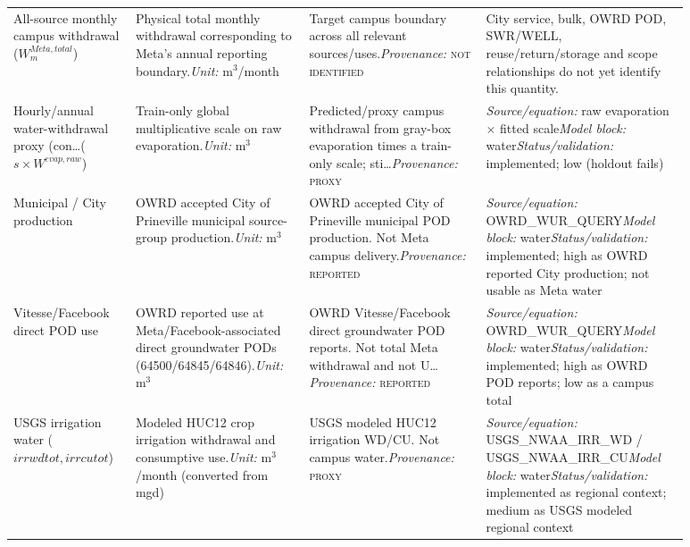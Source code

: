 \documentclass[11pt]{article}
\newcommand{\latesttxt}[1]{\textcolor{purple!85!black}{#1}}
\newcommand{\Reported}{\textsc{reported}}
\newcommand{\Proxy}{\textsc{proxy}}
\newcommand{\NotIdentified}{\textsc{not identified}}
\begin{document}
\begin{longtable}{@{}p{0.16\linewidth}p{0.22\linewidth}p{0.24\linewidth}p{0.26\linewidth}@{}}
\latesttxt{All-source monthly campus withdrawal ($W^{Meta,total}_m$)} & \latesttxt{Physical total monthly withdrawal corresponding to Meta's annual reporting boundary.\newline \textit{Unit:} m$^3$/month} & \latesttxt{Target campus boundary across all relevant sources/uses.\newline \textit{Provenance:} \NotIdentified{}} & \latesttxt{City service, bulk, OWRD POD, SWR/WELL, reuse/return/storage and scope relationships do not yet identify this quantity.}\\
Hourly/annual water-withdrawal proxy (con\ldots ($s \times W^{evap,raw}$) & Train-only global multiplicative scale on raw evaporation.\newline \textit{Unit:} m$^{3}$ & Predicted/proxy campus withdrawal from gray-box evaporation times a train-only scale; sti\ldots\newline \textit{Provenance:} \Proxy{} & \textit{Source/equation:} raw evaporation $\times$ fitted scale\newline \textit{Model block:} water\newline \textit{Status/validation:} implemented; low (holdout fails)\\
Municipal / City production & OWRD accepted City of Prineville municipal source-group production.\newline \textit{Unit:} m$^{3}$ & OWRD accepted City of Prineville municipal POD production. Not Meta campus delivery.\newline \textit{Provenance:} \Reported{} & \textit{Source/equation:} OWRD\_WUR\_QUERY\newline \textit{Model block:} water\newline \textit{Status/validation:} implemented; high as OWRD reported City production; not usable as Meta water\\
Vitesse/Facebook direct POD use & OWRD reported use at Meta/Facebook-associated direct groundwater PODs (64500/64845/64846).\newline \textit{Unit:} m$^{3}$ & OWRD Vitesse/Facebook direct groundwater POD reports. Not total Meta withdrawal and not U\ldots\newline \textit{Provenance:} \Reported{} & \textit{Source/equation:} OWRD\_WUR\_QUERY\newline \textit{Model block:} water\newline \textit{Status/validation:} implemented; high as OWRD POD reports; low as a campus total\\
USGS irrigation water ($irrwdtot, irrcutot$) & Modeled HUC12 crop irrigation withdrawal and consumptive use.\newline \textit{Unit:} m$^{3}$/month (converted from mgd) & USGS modeled HUC12 irrigation WD/CU. Not campus water.\newline \textit{Provenance:} \Proxy{} & \textit{Source/equation:} USGS\_NWAA\_IRR\_WD / USGS\_NWAA\_IRR\_CU\newline \textit{Model block:} water\newline \textit{Status/validation:} implemented as regional context; medium as USGS modeled regional context\\

\end{longtable}
\end{document}
